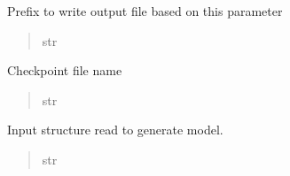 \documentclass[letterpaper,10pt,english]{sphinxmanual}
\begin{document}
\begin{fulllineitems}
\begin{fulllineitems}
\begin{quote}
\begin{description}
\end{description}\end{quote}

\end{fulllineitems}


\begin{fulllineitems}
\label{\detokenize{modules/dynamics:hps.dynamics.Dynamics.protein_code}}
\pysigstartsignatures
{}
\pysigstopsignatures
\sphinxAtStartPar
Prefix to write output file based on this parameter
\begin{quote}\begin{description}
\sphinxAtStartPar
str

\end{description}\end{quote}

\end{fulllineitems}


\begin{fulllineitems}
\label{\detokenize{modules/dynamics:hps.dynamics.Dynamics.checkpoint}}
\pysigstartsignatures
{}
\pysigstopsignatures
\sphinxAtStartPar
Checkpoint file name
\begin{quote}\begin{description}
\sphinxAtStartPar
str

\end{description}\end{quote}

\end{fulllineitems}


\begin{fulllineitems}
\label{\detokenize{modules/dynamics:hps.dynamics.Dynamics.pdb_file}}
\pysigstartsignatures
{}
\pysigstopsignatures
\sphinxAtStartPar
Input structure read to generate model.
\begin{quote}\begin{description}
\sphinxAtStartPar
str


\end{description}
\end{quote}
\end{fulllineitems}
\end{fulllineitems}
\end{document}
